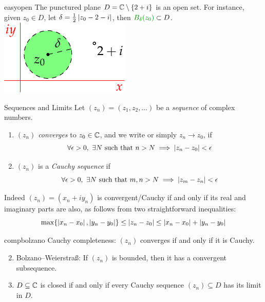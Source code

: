\begin{example}[lower separated=false, sidebyside, sidebyside align=top seam, sidebyside gap=0pt, righthand width=0.3\linewidth]{}{easyopen}
	The punctured plane $D=\mathbb{C}\setminus\{2+i\}$ is an open set. For instance, given $z_0\in D$, let $\delta=\frac 12\left| z_0-2-i\right|$, then $\textcolor{Green}{B_\delta(z_0)}\subset D$.
	\tcblower
	\flushright
	\includegraphics[scale=0.95]{limits-punctured}
\end{example}

\begin{defn}{Sequences and Limits}{}{}
	Let $(z_n)=(z_1,z_2,\ldots)$ be a \emph{sequence} of complex numbers.
	\begin{enumerate}\itemsep0pt
	  \item $(z_n)$ \emph{converges} to $z_0\in\mathbb{C}$, and we write  or simply $z_n\to z_0$, if
		\[
			\forall \epsilon>0,\ \exists N\text{ such that }n>N\implies \left| z_n-z_0\right|<\epsilon
		\]
		
		\item $(z_n)$ is a \emph{Cauchy sequence} if
		\[
			\forall \epsilon>0,\ \exists N\text{ such that }m,n>N\implies \left| z_m-z_n\right|<\epsilon
		\]
	\end{enumerate}
\end{defn}

Indeed $(z_n)=(x_n+iy_n)$ is convergent/Cauchy if and only if its real and imaginary parts are also, as follows from two straightforward inequalities:
\[
	\max\{\left| x_n-x_0\right|,\left| y_n-y_0\right| \} \le \left| z_n-z_0\right| \le \left| x_n-x_0\right|+\left| y_n-y_0\right|
\]


\begin{thm}{}{compbolzano}
	\exstart Cauchy completeness: $(z_n)$ converges if and only if it is Cauchy.\vspace{-2pt}
	\begin{enumerate}\setcounter{enumi}{1}\itemsep1pt
	  \item Bolzano--Weierstraß: If $(z_n)$ is bounded, then it has a convergent subsequence.
	  \item\label{thm:closedlimit3} $D\subseteq\mathbb{C}$ is closed if and only if every Cauchy sequence $(z_n)\subseteq D$ has its limit in $D$.
	\end{enumerate}
\end{thm}

